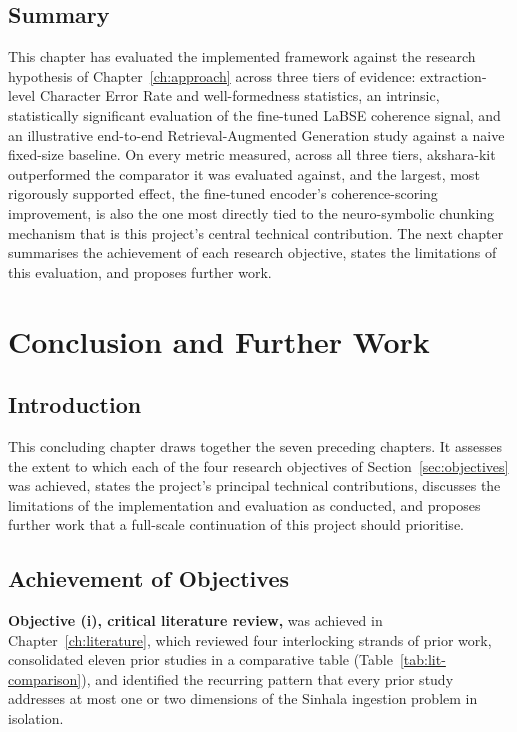 \documentclass[12pt,a4paper,oneside]{report}
\begin{document}
\section{Summary}
\label{sec:ch7-summary}
This chapter has evaluated the implemented framework against the research hypothesis of Chapter~\ref{ch:approach} across three tiers of evidence: extraction-level Character Error Rate and well-formedness statistics, an intrinsic, statistically significant evaluation of the fine-tuned LaBSE coherence signal, and an illustrative end-to-end Retrieval-Augmented Generation study against a naive fixed-size baseline. On every metric measured, across all three tiers, akshara-kit outperformed the comparator it was evaluated against, and the largest, most rigorously supported effect, the fine-tuned encoder's coherence-scoring improvement, is also the one most directly tied to the neuro-symbolic chunking mechanism that is this project's central technical contribution. The next chapter summarises the achievement of each research objective, states the limitations of this evaluation, and proposes further work.

\chapter{Conclusion and Further Work}
\label{ch:conclusion}

\section{Introduction}
This concluding chapter draws together the seven preceding chapters. It assesses the extent to which each of the four research objectives of Section~\ref{sec:objectives} was achieved, states the project's principal technical contributions, discusses the limitations of the implementation and evaluation as conducted, and proposes further work that a full-scale continuation of this project should prioritise.

\section{Achievement of Objectives}
\label{sec:concl-objectives}
\textbf{Objective (i), critical literature review,} was achieved in Chapter~\ref{ch:literature}, which reviewed four interlocking strands of prior work, consolidated eleven prior studies in a comparative table (Table~\ref{tab:lit-comparison}), and identified the recurring pattern that every prior study addresses at most one or two dimensions of the Sinhala ingestion problem in isolation.
\end{document}
